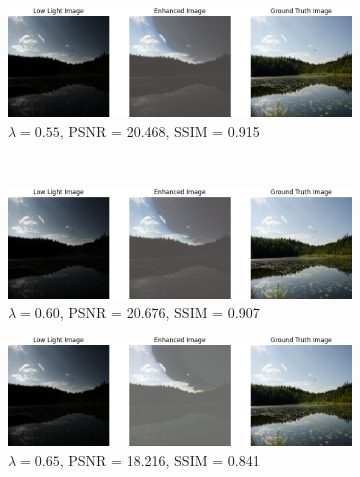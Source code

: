 \documentclass[a4paper]{ctexart}
\begin{document}
\begin{figure}[htbp]
			\begin{subfigure}{0.45\textwidth}
				\includegraphics[width=\linewidth]{picture/LLIE/Experiment/myplot_skip_stem_lambda_0.55_fpn_ssim_0.9145_psnr_20.4681}
				\caption{$\lambda = 0.55$, PSNR = 20.468, SSIM = 0.915}
				\label{fig: fpn_lambda = 0.55}	
			\end{subfigure}\\
			\begin{subfigure}{0.45\textwidth}
				\includegraphics[width=\linewidth]{picture/LLIE/Experiment/myplot_skip_stem_lambda_0.60_fpn_ssim_0.9071_psnr_20.6762}
				\caption{$\lambda = 0.60$, PSNR = 20.676, SSIM = 0.907}
				\label{fig: fpn_lambda = 0.60}	
			\end{subfigure}
			\begin{subfigure}{0.45\textwidth}
				\includegraphics[width=\linewidth]{picture/LLIE/Experiment/myplot_skip_stem_lambda_0.65_fpn_ssim_0.8414_psnr_18.2163}
				\caption{$\lambda = 0.65$, PSNR = 18.216, SSIM = 0.841}
				\label{fig: fpn_lambda = 0.65}	
			\end{subfigure}
			\begin{subfigure}{0.45\textwidth}

\end{subfigure}
\end{figure}
\end{document}
